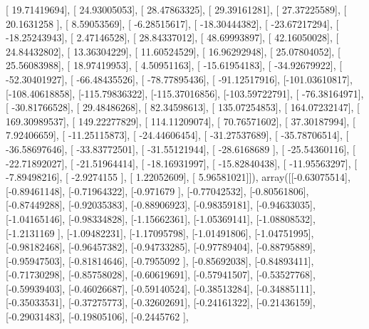 \documentclass{article}
\begin{document}
       [  19.71419694],
       [  24.93005053],
       [  28.47863325],
       [  29.39161281],
       [  27.37225589],
       [  20.1631258 ],
       [   8.59053569],
       [  -6.28515617],
       [ -18.30444382],
       [ -23.67217294],
       [ -18.25243943],
       [   2.47146528],
       [  28.84337012],
       [  48.69993897],
       [  42.16050028],
       [  24.84432802],
       [  13.36304229],
       [  11.60524529],
       [  16.96292948],
       [  25.07804052],
       [  25.56083988],
       [  18.97419953],
       [   4.50951163],
       [ -15.61954183],
       [ -34.92679922],
       [ -52.30401927],
       [ -66.48435526],
       [ -78.77895436],
       [ -91.12517916],
       [-101.03610817],
       [-108.40618858],
       [-115.79836322],
       [-115.37016856],
       [-103.59722791],
       [ -76.38164971],
       [ -30.81766528],
       [  29.48486268],
       [  82.34598613],
       [ 135.07254853],
       [ 164.07232147],
       [ 169.30989537],
       [ 149.22277829],
       [ 114.11209074],
       [  70.76571602],
       [  37.30187994],
       [   7.92406659],
       [ -11.25115873],
       [ -24.44606454],
       [ -31.27537689],
       [ -35.78706514],
       [ -36.58697646],
       [ -33.83772501],
       [ -31.55121944],
       [ -28.6168689 ],
       [ -25.54360116],
       [ -22.71892027],
       [ -21.51964414],
       [ -18.16931997],
       [ -15.82840438],
       [ -11.95563297],
       [  -7.89498216],
       [  -2.9274155 ],
       [   1.22052609],
       [   5.96581021]]), array([[-0.63075514],
       [-0.89461148],
       [-0.71964322],
       [-0.971679  ],
       [-0.77042532],
       [-0.80561806],
       [-0.87449288],
       [-0.92035383],
       [-0.88906923],
       [-0.98359181],
       [-0.94633035],
       [-1.04165146],
       [-0.98334828],
       [-1.15662361],
       [-1.05369141],
       [-1.08808532],
       [-1.2131169 ],
       [-1.09482231],
       [-1.17095798],
       [-1.01491806],
       [-1.04751995],
       [-0.98182468],
       [-0.96457382],
       [-0.94733285],
       [-0.97789404],
       [-0.88795889],
       [-0.95947503],
       [-0.81814646],
       [-0.7955092 ],
       [-0.85692038],
       [-0.84893411],
       [-0.71730298],
       [-0.85758028],
       [-0.60619691],
       [-0.57941507],
       [-0.53527768],
       [-0.59939403],
       [-0.46026687],
       [-0.59140524],
       [-0.38513284],
       [-0.34885111],
       [-0.35033531],
       [-0.37275773],
       [-0.32602691],
       [-0.24161322],
       [-0.21436159],
       [-0.29031483],
       [-0.19805106],
       [-0.2445762 ],
\end{document}
